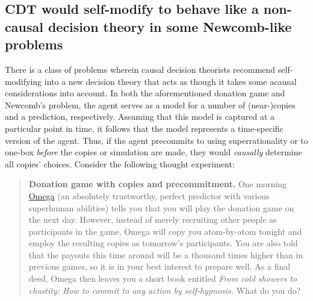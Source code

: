 \hypertarget{cdt-would-self-modify-to-behave-like-a-non-causal-decision-theory-in-some-newcomb-like-problems}{\subsection{CDT
would self-modify to behave like a non-causal decision theory in some
Newcomb-like problems
}\label{cdt-would-self-modify-to-behave-like-a-non-causal-decision-theory-in-some-newcomb-like-problems}}

There is a class of problems wherein causal decision theorists
recommend self-modifying into a new decision theory that acts as though
it takes some acausal considerations into account. In both the
aforementioned donation game and Newcomb's problem, the agent serves as
a model for a number of (near-)copies and a prediction, respectively.
Assuming that this model is captured at a particular point in time, it
follows that the model represents a time-specific version of the agent.
Thus, if the agent precommits to using superrationality or to one-box
\emph{before} the copies or simulation are made, they would
\emph{causally} determine all copies' choices. Consider the following
thought experiment:

\begin{quote}
\textbf{Donation game with copies and precommitment.} One morning
\href{https://wiki.lesswrong.com/wiki/Omega}{Omega} (an
absolutely trustworthy, perfect predictor with various superhuman
abilities) tells you that you will play the donation game on the next
day. However, instead of merely recruiting other people as participants
in the game, Omega will copy you atom-by-atom tonight and employ the
resulting copies as tomorrow's participants. You are also told that the
payouts this time around will be a thousand times higher than in
previous games, so it is in your best interest to prepare well. As a
final deed, Omega then leaves you a short book entitled \emph{From cold
showers to chastity: How to commit to any action by self-hypnosis.} What
do you do?
\end{quote}

